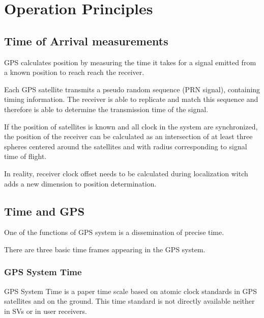 

\section{Operation Principles}

\subsection{Time of Arrival measurements}

GPS calculates position by measuring the time it takes for a signal
emitted from a known position to reach reach the receiver.

Each GPS satellite transmits a pseudo random sequence (PRN signal),
containing timing information.
The receiver is able to replicate and match this sequence and therefore
is able to determine the transmission time of the signal.

If the position of satellites is known and all clock in the system are
synchronized, the position of the receiver
can be calculated as an intersection of at least three spheres centered around the satellites
and with radius corresponding to signal time of flight.

In reality, receiver clock offset needs to be calculated
during localization witch adds a new dimension to position determination.

\subsection{Time and GPS}

One of the functions of GPS system is a dissemination of precise time.

There are three basic time frames appearing in the GPS system.

\subsubsection{GPS System Time}

GPS System Time is a paper time scale based on atomic clock standards in GPS
satellites and on the ground.
This time standard is not directly available neither in SVs or in user receivers.


